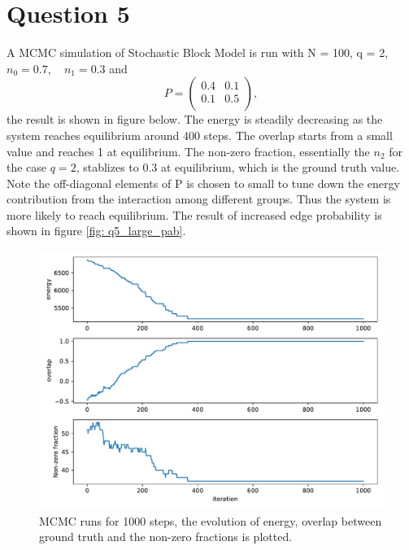 \documentclass[11pt]{article}
\theoremstyle{definition}
\begin{document}
\section*{Question 5}
A MCMC simulation of Stochastic Block Model is run with N = 100, q = 2, $n_0 = 0.7, \quad n_1 = 0.3$ and
$$
P = \begin{pmatrix}
    0.4 & 0.1\\
    0.1 & 0.5\\
\end{pmatrix},
$$
the result is shown in figure below. The energy is steadily decreasing as the system reaches equilibrium around 400 steps. The overlap starts from a small value and reaches 1 at equilibrium. The non-zero fraction, essentially the $n_2$ for the case $q=2$, stablizes to 0.3 at equilibrium, which is the ground truth value.
Note the off-diagonal elements of P is chosen to small to tune down the energy contribution from the interaction among different groups. Thus the system is more likely to reach equilibrium. The result of increased edge probability is shown in figure \ref{fig: q5_large_pab}.
\begin{figure}[t]
    \begin{center}
    \includegraphics[width=0.8\columnwidth]{./q5_states_small_pab.pdf}
    \caption{MCMC runs for 1000 steps, the evolution of energy, overlap between ground truth and the non-zero fractions is plotted.}
    \end{center}
\end{figure}
\end{document}
